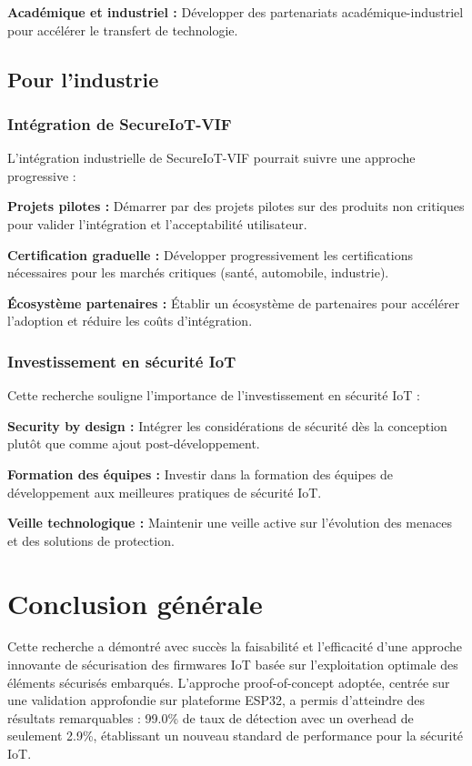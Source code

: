 \textbf{Académique et industriel :} Développer des partenariats académique-industriel pour accélérer le transfert de technologie.

\subsection{Pour l'industrie}

\subsubsection{Intégration de SecureIoT-VIF}

L'intégration industrielle de SecureIoT-VIF pourrait suivre une approche progressive :

\textbf{Projets pilotes :} Démarrer par des projets pilotes sur des produits non critiques pour valider l'intégration et l'acceptabilité utilisateur.

\textbf{Certification graduelle :} Développer progressivement les certifications nécessaires pour les marchés critiques (santé, automobile, industrie).

\textbf{Écosystème partenaires :} Établir un écosystème de partenaires pour accélérer l'adoption et réduire les coûts d'intégration.

\subsubsection{Investissement en sécurité IoT}

Cette recherche souligne l'importance de l'investissement en sécurité IoT :

\textbf{Security by design :} Intégrer les considérations de sécurité dès la conception plutôt que comme ajout post-développement.

\textbf{Formation des équipes :} Investir dans la formation des équipes de développement aux meilleures pratiques de sécurité IoT.

\textbf{Veille technologique :} Maintenir une veille active sur l'évolution des menaces et des solutions de protection.

\section{Conclusion générale}

Cette recherche a démontré avec succès la faisabilité et l'efficacité d'une approche innovante de sécurisation des firmwares IoT basée sur l'exploitation optimale des éléments sécurisés embarqués. L'approche proof-of-concept adoptée, centrée sur une validation approfondie sur plateforme ESP32, a permis d'atteindre des résultats remarquables : 99.0\% de taux de détection avec un overhead de seulement 2.9\%, établissant un nouveau standard de performance pour la sécurité IoT.

